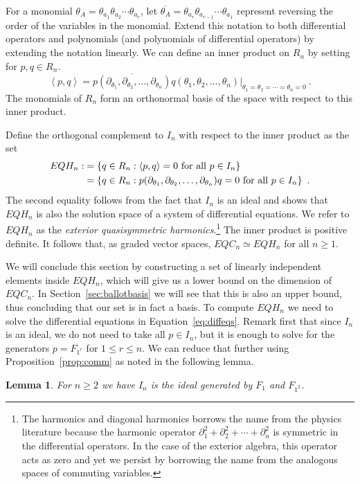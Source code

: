 \documentclass[submission]{FPSAC2023}
\newtheorem{lemma}[theorem]{Lemma}
\theoremstyle{definition}
\numberwithin{equation}{section}
\begin{document}
For a monomial $\theta_A = \theta_{a_1} \theta_{a_2} \cdots \theta_{a_r}$,
let $\overline{\theta_A} = \theta_{a_r} \theta_{a_{r-1}} \cdots \theta_{a_1}$ represent
reversing the order of the variables in the monomial.  Extend this notation to both
differential operators and polynomials (and polynomials of differential operators)
by extending the notation linearly. 
We can define an inner product on $R_n$ by setting for $p,q \in R_n$.
\[
\left< p, q \right> = \overline{p(\partial_{\theta_1}, \partial_{\theta_2}, \ldots, \partial_{\theta_n})}
q( \theta_1, \theta_2, \ldots, \theta_n)|_{\theta_1=\theta_2 = \cdots=\theta_n=0}~.
\]
The monomials of $R_n$ form an orthonormal basis of the space with respect to this
inner product.

Define the orthogonal complement to $I_n$ with respect to the inner product as
the set
\begin{align}
EQH_n :&= \left\{ q \in R_n : \left< p, q \right> = 0 \hbox{ for all } p \in I_n \right\}
\label{eq:set1}\\
  &=\left\{ q \in R_n : p(\partial_{\theta_1}, \partial_{\theta_2}, \ldots, \partial_{\theta_n})
q= 0 \hbox{ for all } p \in I_n \right\}~.\label{eq:diffeqs}
\end{align}
The second equality follows from the fact that $I_n$ is an ideal
and shows that $EQH_n$ is also the solution space of
a system of differential equations.  
We refer to $EQH_n$ as the \emph{exterior quasisymmetric harmonics}.\footnote{
The harmonics and diagonal harmonics borrows the name from the physics literature
because the harmonic operator $\partial_1^2 + \partial_2^2 + \cdots + \partial_n^2$
is symmetric in the differential operators.  In the case of the exterior algebra,
this operator acts as zero and yet we persist by borrowing the name from the
analogous spaces of commuting variables.
} 
The inner product is positive definite. It follows that, as graded vector spaces, $
EQC_n \simeq EQH_n$ for all $n \ge 1$.

We will conclude this section  by constructing a set of linearly independent elements inside $EQH_n$, which will
give us a lower  bound on the dimension of $EQC_n$. In Section~\ref{sec:ballotbasis} we will see that this is also an upper bound,
thus concluding that our  set is in fact a basis. To compute $EQH_n$ we need to solve the differential equations in Equation~\eqref{eq:diffeqs}.
Remark first  that since $I_n$ is an ideal, we do not need to take all $p\in I_n$, but it is enough to solve for the generators $p=F_{1^r}$ for  $1\le r\le n$.
We can reduce that further using Proposition~\ref{prop:comm} as noted in the following lemma.
\begin{lemma}\label{lem:idealgen}
For $n\ge 2$ we have $I_n$ is the ideal generated by $F_1$ and $F_{1^2}$.
\end{lemma}
\end{document}
